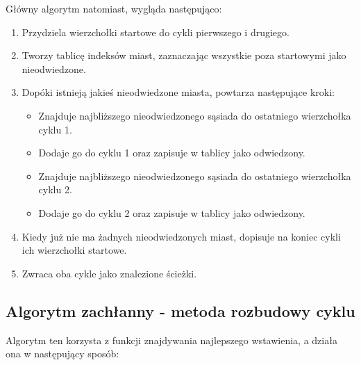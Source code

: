 \documentclass[11pt]{article}
\begin{document}
Główny algorytm natomiast, wygląda następująco:

\begin{enumerate}
    \item Przydziela wierzchołki startowe do cykli pierwszego i drugiego.
    \item Tworzy tablicę indeksów miast, zaznaczając wszystkie poza startowymi jako nieodwiedzone.
    \item Dopóki istnieją jakieś nieodwiedzone miasta, powtarza następujące kroki:
    \begin{itemize}
        \item Znajduje najbliższego nieodwiedzonego sąsiada do ostatniego wierzchołka cyklu 1.
        \item Dodaje go do cyklu 1 oraz zapisuje w tablicy jako odwiedzony.
        \item Znajduje najbliższego nieodwiedzonego sąsiada do ostatniego wierzchołka cyklu 2.
        \item Dodaje go do cyklu 2 oraz zapisuje w tablicy jako odwiedzony.
    \end{itemize}
    \item Kiedy już nie ma żadnych nieodwiedzonych miast, dopisuje na koniec cykli ich wierzchołki startowe.
    \item Zwraca oba cykle jako znalezione ścieżki.
\end{enumerate}


\subsection{Algorytm zachłanny - metoda rozbudowy cyklu}\label{subsec:algorytm-zachanny---metoda-rozbudowy-cyklu}

Algorytm ten korzysta z funkcji znajdywania najlepszego wstawienia, a działa ona w następujący sposób:
\end{document}
